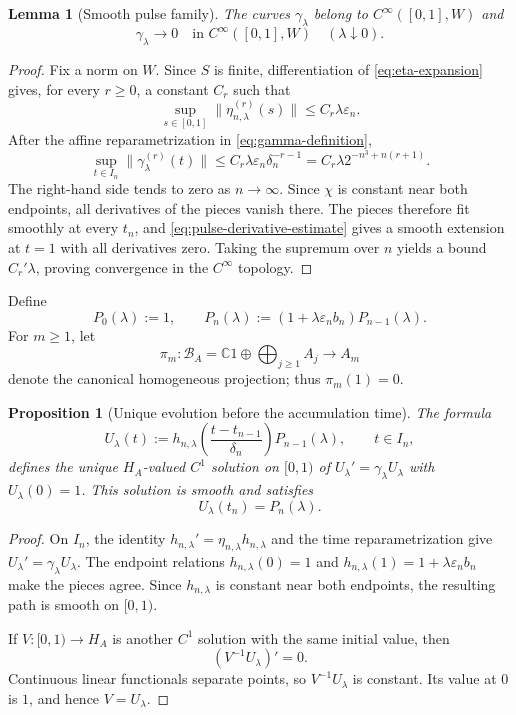 \documentclass[11pt]{article}
\newtheorem{proposition}[theorem]{Proposition}
\newtheorem{lemma}[theorem]{Lemma}
\theoremstyle{remark}
\begin{document}
\begin{lemma}[Smooth pulse family]
\label{lem:smooth-pulses}
The curves $\gamma_\lambda$ belong to $C^\infty([0,1],W)$ and
\[
  \gamma_\lambda\longrightarrow0
  \quad\text{in }C^\infty([0,1],W)
  \quad(\lambda\downarrow0).
\]
\end{lemma}

\begin{proof}
Fix a norm on $W$.  Since $S$ is finite, differentiation of
\eqref{eq:eta-expansion} gives, for every $r\geq0$, a constant $C_r$ such
that
\[
  \sup_{s\in[0,1]}\|\eta_{n,\lambda}^{(r)}(s)\|
  \leq C_r\lambda\varepsilon_n.
\]
After the affine reparametrization in \eqref{eq:gamma-definition},
\begin{equation}
  \sup_{t\in I_n}\|\gamma_\lambda^{(r)}(t)\|
  \leq C_r\lambda\varepsilon_n\delta_n^{-r-1}
  =C_r\lambda 2^{-n^3+n(r+1)}.
  \label{eq:pulse-derivative-estimate}
\end{equation}
The right-hand side tends to zero as $n\to\infty$.  Since $\chi$ is constant
near both endpoints, all derivatives of the pieces vanish there.  The pieces
therefore fit smoothly at every $t_n$, and
\eqref{eq:pulse-derivative-estimate} gives a smooth extension at $t=1$ with
all derivatives zero.  Taking the supremum over $n$ yields a bound
$C_r'\lambda$, proving convergence in the $C^\infty$ topology.
\end{proof}

Define
\[
  P_0(\lambda):=1,
  \qquad
  P_n(\lambda):=(1+\lambda\varepsilon_n b_n)P_{n-1}(\lambda).
\]
For $m\geq1$, let
\[
  \pi_m:\mathcal B_A=\mathbb C1\oplus\bigoplus_{j\geq1}A_j
  \longrightarrow A_m
\]
denote the canonical homogeneous projection; thus $\pi_m(1)=0$.

\begin{proposition}[Unique evolution before the accumulation time]
\label{prop:local-evolution}
The formula
\begin{equation}
  U_\lambda(t):=
  h_{n,\lambda}\left(\frac{t-t_{n-1}}{\delta_n}\right)
  P_{n-1}(\lambda),
  \qquad t\in I_n,
  \label{eq:local-evolution}
\end{equation}
defines the unique $H_A$-valued $C^1$ solution on $[0,1)$ of
$U_\lambda'=\gamma_\lambda U_\lambda$ with $U_\lambda(0)=1$.  This
solution is smooth and satisfies
\[
  U_\lambda(t_n)=P_n(\lambda).
\]
\end{proposition}

\begin{proof}
On $I_n$, the identity
$h_{n,\lambda}'=\eta_{n,\lambda}h_{n,\lambda}$ and the time
reparametrization give $U_\lambda'=\gamma_\lambda U_\lambda$.  The endpoint
relations $h_{n,\lambda}(0)=1$ and
$h_{n,\lambda}(1)=1+\lambda\varepsilon_n b_n$ make the pieces agree.  Since
$h_{n,\lambda}$ is constant near both endpoints, the resulting path is smooth
on $[0,1)$.

If $V:[0,1)\to H_A$ is another $C^1$ solution with the same initial value,
then
\[
  (V^{-1}U_\lambda)'=0.
\]
Continuous linear functionals separate points, so $V^{-1}U_\lambda$ is
constant.  Its value at $0$ is $1$, and hence $V=U_\lambda$.
\end{proof}
\end{document}
